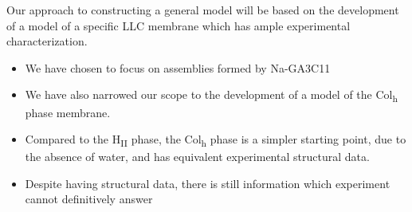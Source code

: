 \documentclass{article}
\begin{document}
  Our approach to constructing a general model will be based on the development of a
  model of a specific LLC membrane which has ample experimental characterization. %
    \begin{itemize}
    \item We have chosen to focus on assemblies formed by Na-GA3C11
    \item We have also narrowed our scope to the development of 
    a model of the Col\textsubscript{h} phase membrane.
    \item Compared to the H\textsubscript{II} phase, the Col\textsubscript{h}
    phase is a simpler starting point, due to the absence of water, and has
    equivalent experimental structural data.
    \item Despite having structural data, there is still information which 
    experiment cannot definitively answer
    \end{itemize}



\end{document}
